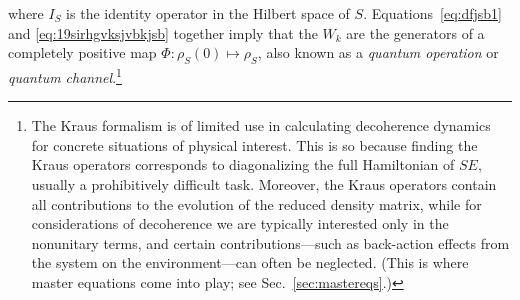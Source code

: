 \documentclass[aps,pra,reprint,amsmath,amssymb,showpacs,nofootinbib,floatfix,onecolumn,12pt]{revtex4-1}
\begin{document}
%
where $I_S$ is the identity operator in the Hilbert space of $S$. Equations~\eqref{eq:dfjsb1} and \eqref{eq:19sirhgvksjvbkjsb} together imply that the $W_k$ are the generators of a completely positive map $\Phi: \rho_S(0) \mapsto \rho_S$, also known as a \emph{quantum operation} \cite{Kraus:1983:ee} or \emph{quantum channel}.\footnote{The Kraus formalism is of limited use in calculating decoherence dynamics for concrete situations of physical interest. This is so because finding the Kraus operators corresponds to diagonalizing the full Hamiltonian of $SE$, usually a prohibitively difficult task. Moreover, the Kraus operators contain all contributions to the evolution of the reduced density matrix, while for considerations of decoherence we are typically interested only in the nonunitary terms, and certain contributions---such as back-action effects from the system on the environment---can often be neglected. (This is where master equations come into play; see Sec.~\ref{sec:mastereqs}.)} 
\end{document}
